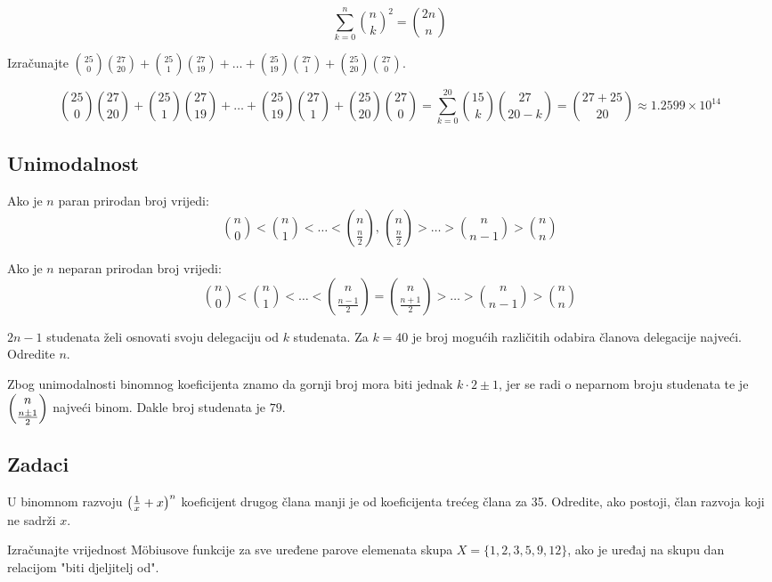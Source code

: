 \begin{corollary}
    $$
        \sum_{k=0}^{n} \binom{n}{k}^2 = \binom{2n}{n}
    $$
\end{corollary}

\begin{example}
    Izračunajte $\displaystyle \binom{25}{0}\binom{27}{20}+\binom{25}{1}\binom{27}{19}+\dots+\binom{25}{19}\binom{27}{1}+\binom{25}{20}\binom{27}{0}$.
\end{example}

$$
    \binom{25}{0}\binom{27}{20}+\binom{25}{1}\binom{27}{19}+\dots+\binom{25}{19}\binom{27}{1}+\binom{25}{20}\binom{27}{0} = \sum_{k=0}^{20} \binom{15}{k}\binom{27}{20-k} = \binom{27+25}{20} \approx 1.2599 \times 10^{14}
$$


\subsection{Unimodalnost}

Ako je $n$ paran prirodan broj vrijedi:
$$
\binom{n}{0}<\binom{n}{1}<\dots<\binom{n}{\frac{n}{2}},\, \binom{n}{\frac{n}{2}}>\dots>\binom{n}{n-1}>\binom{n}{n}
$$

\noindent
Ako je $n$ neparan prirodan broj vrijedi:
$$
\binom{n}{0}<\binom{n}{1}<\dots<\binom{n}{\frac{n-1}{2}} = \binom{n}{\frac{n+1}{2}}>\dots>\binom{n}{n-1}>\binom{n}{n}
$$


\begin{example}
    $2n - 1$ studenata želi osnovati svoju delegaciju od $k$ studenata. Za $k = 40$ je
    broj mogućih različitih odabira članova delegacije najveći. Odredite $n$.
\end{example}

Zbog unimodalnosti binomnog koeficijenta znamo da gornji broj mora biti jednak
$k\cdot 2 \pm 1$, jer se radi o neparnom broju studenata te je
$\dbinom{n}{\frac{n\pm 1}{2}}$ najveći binom. Dakle broj studenata je $79$.

\subsection{Zadaci}

\begin{example}
    U binomnom razvoju $\left({1\over x} + x\right)^n$ koeficijent drugog člana
    manji je od koeficijenta trećeg člana za 35. Odredite, ako postoji, član
    razvoja koji ne sadrži $x$.
\end{example}

\begin{example}
    Izračunajte vrijednost Möbiusove funkcije za sve uređene parove elemenata
    skupa $X=\{1,2,3,5,9,12\}$, ako je uređaj na skupu dan relacijom "biti
    djeljitelj od".
\end{example}
